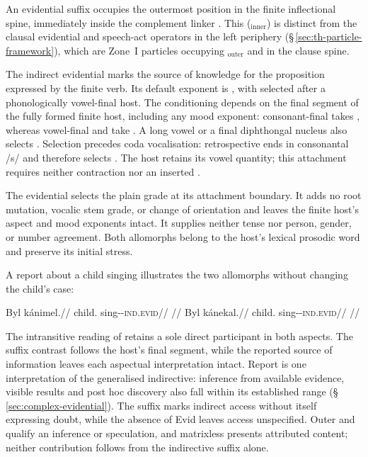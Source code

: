 An evidential suffix occupies the outermost position in the finite inflectional
spine, immediately inside the complement linker . This  ($_\text{inner}$) is distinct from the clausal
evidential and speech-act operators in the left periphery
(§\,\ref{sec:th-particle-framework}), which are Zone~I particles occupying
$_\text{outer}$ and  in the clause spine.

The indirect evidential marks the source of knowledge for the proposition
expressed by the finite verb. Its default exponent is , with
 selected after a phonologically vowel-final host. The conditioning
depends on the final segment of the fully formed finite host, including any
mood exponent: consonant-final  takes , whereas
vowel-final  and  take . A long vowel
or a final diphthongal nucleus also selects . Selection precedes
coda vocalisation: retrospective  ends in consonantal /s/
and therefore selects . The host retains its vowel quantity; this attachment
requires neither contraction nor an inserted .

The evidential selects the plain grade at its attachment boundary. It adds
no root mutation, vocalic stem grade, or change of orientation and leaves
the finite host's aspect and mood exponents intact. It supplies neither
tense nor person, gender, or number agreement. Both allomorphs belong to
the host's lexical prosodic word and preserve its initial stress.

A report about a child singing illustrates the two allomorphs
without changing the child's case:

\pex\label{ex:vm-slot-evidential-hosts}
\a
\begingl
\gla Byl kánimel.//
\glb child.\Dir{} sing-\Prog{}-\textsc{ind.evid}//
\glft {}
//
\endgl
\a
\begingl
\gla Byl kánekal.//
\glb child.\Dir{} sing-\Pf{}-\textsc{ind.evid}//
\glft {}
//
\endgl
\xe

The intransitive reading of  retains a sole direct participant in
both aspects. The suffix contrast follows the host's final segment, while
the reported source of information leaves each aspectual interpretation intact.
Report is one interpretation of the generalised indirective: inference from
available evidence, visible results and post hoc discovery also fall within
its established range (§\,\ref{sec:complex-evidential}). The suffix
marks indirect access without itself expressing doubt, while the absence
of Evid leaves access unspecified. Outer  and 
qualify an inference or speculation, and matrixless 
presents attributed content; neither contribution follows from the
indirective suffix alone.

